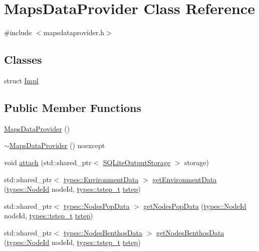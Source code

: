 \hypertarget{class_maps_data_provider}{}\section{Maps\+Data\+Provider Class Reference}
\label{class_maps_data_provider}


{\ttfamily \#include $<$mapsdataprovider.\+h$>$}

\subsection*{Classes}
\begin{DoxyCompactItemize}
\item 
struct \mbox{\hyperlink{struct_maps_data_provider_1_1_impl}{Impl}}
\end{DoxyCompactItemize}
\subsection*{Public Member Functions}
\begin{DoxyCompactItemize}
\item 
\mbox{\hyperlink{class_maps_data_provider_ab1c35fe348c21b53e07d17157d35ca87}{Maps\+Data\+Provider}} ()
\item 
\mbox{\hyperlink{class_maps_data_provider_a3dfcf4f1d0e7cef6a5ddd37a97d26e73}{$\sim$\+Maps\+Data\+Provider}} () noexcept
\item 
void \mbox{\hyperlink{class_maps_data_provider_a9853ba4d6845a6f4de6ad4ef381e6e3c}{attach}} (std\+::shared\+\_\+ptr$<$ \mbox{\hyperlink{class_s_q_lite_output_storage}{S\+Q\+Lite\+Output\+Storage}} $>$ storage)
\item 
std\+::shared\+\_\+ptr$<$ \mbox{\hyperlink{structtypes_1_1_environment_data}{types\+::\+Environment\+Data}} $>$ \mbox{\hyperlink{class_maps_data_provider_a76657367c99e65974a84385f878a4b90}{get\+Environment\+Data}} (\mbox{\hyperlink{classtypes_1_1_node_id}{types\+::\+Node\+Id}} node\+Id, \mbox{\hyperlink{namespacetypes_a9dc53a5ce11a196d82a6983030de8028}{types\+::tstep\+\_\+t}} \mbox{\hyperlink{thread__vessels_8cpp_a84bc73d278de929ec9974e1a95d9b23a}{tstep}})
\item 
std\+::shared\+\_\+ptr$<$ \mbox{\hyperlink{structtypes_1_1_nodes_pop_data}{types\+::\+Nodes\+Pop\+Data}} $>$ \mbox{\hyperlink{class_maps_data_provider_a6173d4eb0bc44ad3b614fb9457ecb65c}{get\+Nodes\+Pop\+Data}} (\mbox{\hyperlink{classtypes_1_1_node_id}{types\+::\+Node\+Id}} node\+Id, \mbox{\hyperlink{namespacetypes_a9dc53a5ce11a196d82a6983030de8028}{types\+::tstep\+\_\+t}} \mbox{\hyperlink{thread__vessels_8cpp_a84bc73d278de929ec9974e1a95d9b23a}{tstep}})
\item 
std\+::shared\+\_\+ptr$<$ \mbox{\hyperlink{structtypes_1_1_nodes_benthos_data}{types\+::\+Nodes\+Benthos\+Data}} $>$ \mbox{\hyperlink{class_maps_data_provider_a71e55ee06fc299a45ad90aef2e714653}{get\+Nodes\+Benthos\+Data}} (\mbox{\hyperlink{classtypes_1_1_node_id}{types\+::\+Node\+Id}} node\+Id, \mbox{\hyperlink{namespacetypes_a9dc53a5ce11a196d82a6983030de8028}{types\+::tstep\+\_\+t}} \mbox{\hyperlink{thread__vessels_8cpp_a84bc73d278de929ec9974e1a95d9b23a}{tstep}})
\end{DoxyCompactItemize}


